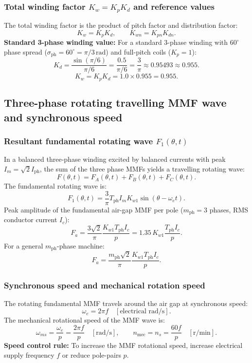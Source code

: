 \subsubsection{Total winding factor $K_w = K_p K_d$ and reference values}
The total winding factor is the product of pitch factor and distribution factor:
\[
K_w = K_p K_d,
\qquad
K_{wn} = K_{pn} K_{dn}.
\]
\textbf{Standard 3-phase winding value:}
For a standard 3-phase winding with \(60^\circ\) phase spread (\(\sigma_{\mathrm{ph}} = 60^\circ = \pi/3\,\mathrm{rad}\)) and full-pitch coils (\(K_p = 1\)):
\[
K_d = \frac{\sin(\pi/6)}{\pi/6} = \frac{0.5}{\pi/6} = \frac{3}{\pi} \approx 0.95493 \approx 0.955.
\]
\[
K_w = K_p K_d = 1.0 \times 0.955 = 0.955.
\]

\subsection{Three-phase rotating travelling MMF wave and synchronous speed}

\subsubsection{Resultant fundamental rotating wave $F_1(\theta, t)$}
In a balanced three-phase winding excited by balanced currents with peak \(I_m = \sqrt{2}I_{\mathrm{ph}}\), the sum of the three phase MMFs yields a travelling rotating wave:
\[
F(\theta, t) = F_A(\theta, t) + F_B(\theta, t) + F_C(\theta, t).
\]
The fundamental rotating wave is:
\[
F_1(\theta, t) = \frac{3}{\pi} T_{\mathrm{ph}} I_m K_{w1}\sin(\theta - \omega_e t).
\]
Peak amplitude of the fundamental air-gap MMF per pole (\(m_{\mathrm{ph}}=3\) phases, RMS conductor current \(I_c\)):
\[
F_a = \frac{3\sqrt{2}}{\pi} \frac{K_{w1} T_{\mathrm{ph}} I_c}{p} = 1.35\, K_{w1} \frac{T_{\mathrm{ph}} I_c}{p}.
\]
For a general \(m_{\mathrm{ph}}\)-phase machine:
\[
F_a = \frac{m_{\mathrm{ph}}\sqrt{2}}{\pi} \frac{K_{w1} T_{\mathrm{ph}} I_c}{p}.
\]

\subsubsection{Synchronous speed and mechanical rotation speed}
The rotating fundamental MMF travels around the air gap at synchronous speed:
\[
\omega_e = 2\pi f\quad[\text{electrical rad/s}].
\]
The mechanical rotational speed of the MMF wave is:
\[
\omega_{ms} = \frac{\omega_e}{p} = \frac{2\pi f}{p}\quad[\text{rad/s}],
\qquad
n_{\mathrm{mec}} = n_s = \frac{60 f}{p}\quad[\mathrm{r/min}].
\]
\textbf{Speed control rule:} To increase the MMF rotational speed, increase electrical supply frequency \(f\) or reduce pole-pairs \(p\).

